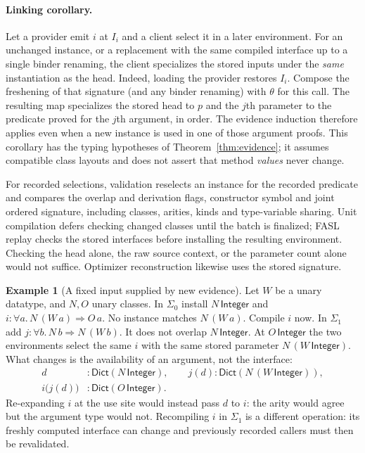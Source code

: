 \documentclass[11pt]{article}
\theoremstyle{definition}
\newtheorem{example}[theorem]{Example}
\newcommand{\Int}{\mathsf{Integer}}
\newcommand{\Dict}{\mathsf{Dict}}
\begin{document}
\paragraph{Linking corollary.}
Let a provider emit $i$ at $I_i$ and a client select it in a later
environment. For an unchanged instance, or a replacement with the same
compiled interface up to a single binder renaming, the client specializes
the stored inputs under the \emph{same} instantiation as the head.
Indeed, loading the provider restores $I_i$. Compose the freshening of
that signature (and any binder renaming) with $\theta$ for this call.
The resulting map specializes the stored head to $p$ and the $j$th
parameter to the predicate proved for the $j$th argument, in order.
The evidence induction therefore applies even when a new instance is
used in one of those argument proofs. This corollary has the typing
hypotheses of Theorem~\ref{thm:evidence}; it assumes compatible class
layouts and does not assert that method \emph{values} never change.

For recorded selections, validation reselects an instance for the recorded
predicate and compares the overlap and derivation flags, constructor symbol and joint
ordered signature, including classes, arities, kinds and type-variable
sharing. Unit compilation defers checking changed classes until the batch
is finalized; FASL replay checks the stored interfaces before installing
the resulting environment. Checking the head
alone, the raw source context, or the parameter count alone would not
suffice. Optimizer reconstruction likewise uses the stored signature.

\begin{example}[A fixed input supplied by new evidence]\label{ex:dict}
Let $W$ be a unary datatype, and $N,O$ unary classes. In $\Sigma_0$ install
$N\,\Int$ and $i:\forall a.\,N\,(W\,a)\Rightarrow O\,a$. No instance
matches $N\,(W\,a)$. Compile $i$ now. In $\Sigma_1$ add
$j:\forall b.\,N\,b\Rightarrow N\,(W\,b)$. It does not overlap
$N\,\Int$. At $O\,\Int$ the two environments select the same $i$
with the same stored parameter $N\,(W\,\Int)$. What changes is the
availability of an argument, not the interface:
\[
\begin{aligned}
 d &: \Dict(N\,\Int),\qquad j(d):\Dict(N\,(W\,\Int)),\\
 i\bigl(j(d)\bigr)&:\Dict(O\,\Int).
\end{aligned}
\]
Re-expanding $i$ at the use site would instead pass $d$ to $i$: the arity
would agree but the argument type would not. Recompiling $i$ in
$\Sigma_1$ is a different operation: its freshly computed interface can
change and previously recorded callers must then be revalidated.
\end{example}
\end{document}

